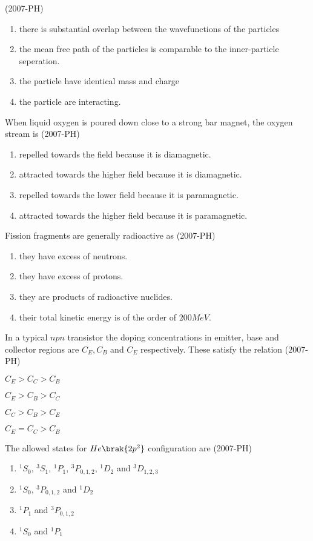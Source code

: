     \hfill(2007-PH)
    \begin{enumerate}
        \item there is substantial overlap between the wavefunctions of the particles
        \item the mean free path of the particles is comparable to the inner-particle seperation.
        \item the particle have identical mass and charge 
        \item the particle are interacting.
\end{enumerate}
\item When liquid oxygen is poured down close to a strong bar magnet, the oxygen stream is  \hfill(2007-PH)
\begin{enumerate}
    \item repelled towards the field because it is diamagnetic.
    \item attracted towards the higher field because it is diamagnetic.
    \item repelled towards the lower field because it is paramagnetic.
    \item attracted towards the higher field because it is paramagnetic.
\end{enumerate}
\item Fission fragments are generally radioactive as \hfill(2007-PH)
\begin{enumerate}
    \item they have excess of neutrons. 
    \item they have excess of protons.
    \item they are products of radioactive nuclides.
    \item their total kinetic energy is of the order of $200MeV$.
\end{enumerate}
\item In a typical $npn$ transistor the doping concentrations in emitter, base and collector regions are $C_E, C_B$ and $C_E$ respectively. These satisfy the relation \hfill(2007-PH)
\begin{enumerate}
    \begin{multicols}{2}
        \item $C_E > C_C > C_B$ 
        \item $C_E > C_B > C_C$
        \item $C_C > C_B > C_E$
        \item $C_E = C_C > C_B$
    \end{multicols}
\end{enumerate}
\item The allowed states for $He\brak{2p^2}$ configuration are \hfill(2007-PH)
\begin{enumerate}
        \item $^1S_0$, $^3 S_1$, $^1P_1$, $^3P_{0,1,2}$, $^1D_2$ and $ ^3D_{1,2,3}$
        \item  $^1S_0$, $^3P_{0,1,2}$ and $^1D_2$
        \item $^1P_1$ and $^3P_{0,1,2}$
        \item $^1S_0$ and $^1P_1$
\end{enumerate}

